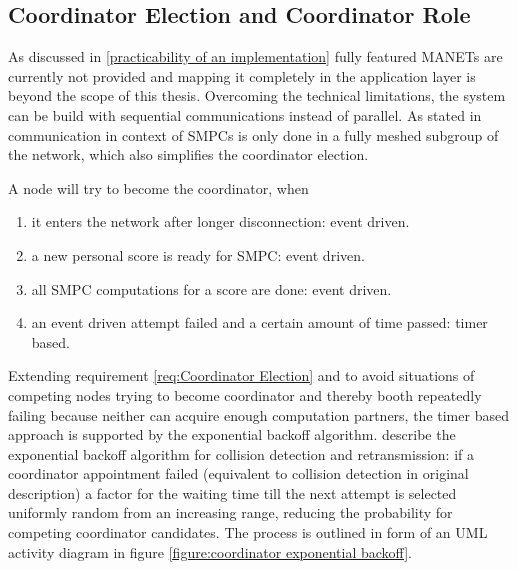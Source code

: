 \subsection{Coordinator Election and Coordinator Role} \label{Coordinator Election}

As discussed in \autoref{practicability of an implementation} fully featured \glspl{MANET} are currently not provided and mapping it completely in the application layer is beyond the scope of this thesis. Overcoming the technical limitations, the system can be build with sequential communications instead of parallel. As stated in  communication in context of \glspl{SMPC} is only done in a fully meshed subgroup of the network, which also simplifies the coordinator election.

\noindent A node will try to become the coordinator, when \nolinebreak
\begin{enumerate}
	\item it enters the network after longer disconnection: event driven.
	\item a new personal score is ready for \gls{SMPC}: event driven.
	\item all \gls{SMPC} computations for a score are done: event driven.
	\item an event driven attempt failed and a certain amount of time passed: timer based.
\end{enumerate}

Extending requirement \ref{req:Coordinator Election} and to avoid situations of competing nodes trying to become coordinator and thereby booth repeatedly failing because neither can acquire enough computation partners, the timer based approach is supported by the exponential backoff algorithm. \textcite[p.67]{IEEE2010} describe the exponential backoff algorithm for collision detection and retransmission: if a coordinator appointment failed (equivalent to collision detection in original description) a factor for the waiting time till the next attempt is selected uniformly random from an increasing range, reducing the probability for competing coordinator candidates. The process is outlined in form of an \gls{UML} activity diagram in figure \ref{figure:coordinator exponential backoff}.

